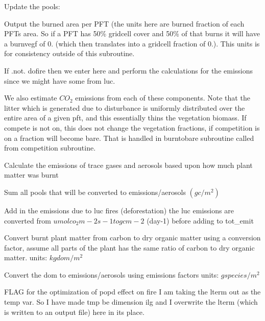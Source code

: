 Update the pools\+:

Output the burned area per P\+F\+T (the units here are burned fraction of each P\+F\+Ts area. So if a P\+F\+T has 50\% gridcell cover and 50\% of that burns it will have a burnvegf of 0. (which then translates into a gridcell fraction of 0.). This units is for consistency outside of this subroutine.

If .not. dofire then we enter here and perform the calculations for the emissions since we might have some from luc.

We also estimate $CO_2$ emissions from each of these components. Note that the litter which is generated due to disturbance is uniformly distributed over the entire area of a given pft, and this essentially thins the vegetation biomass. If compete is not on, this does not change the vegetation fractions, if competition is on a fraction will become bare. That is handled in burntobare subroutine called from competition subroutine.

Calculate the emissions of trace gases and aerosols based upon how much plant matter was burnt

Sum all pools that will be converted to emissions/aerosols $(g c/m^2)$

Add in the emissions due to luc fires (deforestation) the luc emissions are converted from $umol co_2 m-2 s-1 to g c m-2$ (day-\/1) before adding to tot\+\_\+emit

Convert burnt plant matter from carbon to dry organic matter using a conversion factor, assume all parts of the plant has the same ratio of carbon to dry organic matter. units\+: $kg dom / m^2$

Convert the dom to emissions/aerosols using emissions factors units\+: $g species / m^2$

F\+L\+A\+G for the optimization of popd effect on fire I am taking the lterm out as the \textquotesingle{}temp\textquotesingle{} var. So I have made tmp be dimension ilg and I overwrite the lterm (which is written to an output file) here in its place. 